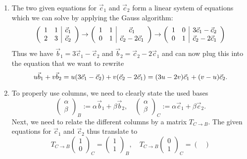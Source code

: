 \documentclass[english]{exercise}
\begin{document}
	\begin{enumerate}
		\item The two given equations for \(\vec{c}_1\) and \(\vec{c}_2\) form a linear system of equations which we can solve by applying the Gauss algorithm:
		\[
			\parentheses*{\begin{array}{cc|c}
				1 & 1 & \vec{c}_1\\
				2 & 3 & \vec{c}_2
			\end{array}} \to \parentheses*{\begin{array}{cc|c}
				1 & 1 & \vec{c}_1\\
				0 & 1 & \vec{c}_2 - 2\vec{c}_1
			\end{array}} \to \parentheses*{\begin{array}{cc|c}
				1 & 0 & 3\vec{c}_1 - \vec{c}_2\\
				0 & 1 & \vec{c}_2 - 2\vec{c}_1
			\end{array}}
		\]
		Thus we have \(\vec{b}_1 = 3\vec{c}_1 - \vec{c}_2\) and \(\vec{b}_2 = \vec{c}_2 - 2\vec{c}_1\) and can now plug this into the equation that we want to rewrite
		\[
			u\vec{b}_1 + v\vec{b}_2 = u\parentheses*{3\vec{c}_1 - \vec{c}_2} + v\parentheses*{\vec{c}_2 - 2\vec{c}_1} = \parentheses*{3u - 2v}\vec{c}_1 + \parentheses*{v - u}\vec{c}_2.
		\]
		\item To properly use columns, we need to clearly state the used bases
		\[
			\begin{pmatrix}
				\alpha\\
				\beta
			\end{pmatrix}_B := \alpha\vec{b}_1 + \beta\vec{b}_2, \quad \begin{pmatrix}
				\alpha\\
				\beta
			\end{pmatrix}_C := \alpha\vec{c}_1 + \beta\vec{c}_2.
		\]
		Next, we need to relate the different columns by a matrix \(T_{C \to B}\).
		The given equations for \(\vec{c}_1\) and \(\vec{c}_2\) thus translate to
		\[
			T_{C \to B}\begin{pmatrix}
				1\\
				0
			\end{pmatrix}_C = \begin{pmatrix}
				1\\
				1
			\end{pmatrix}_B, \quad T_{C \to B}\begin{pmatrix}
				0\\
				1
			\end{pmatrix}_C = \begin{pmatrix}

\end{pmatrix}\]
\end{enumerate}
\end{document}
